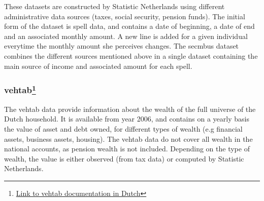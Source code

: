 \documentclass[12pt,a4paper]{article}
\begin{document}
These datasets are constructed by Statistic Netherlands using different administrative data sources (taxes, social security, pension funds). The initial form of the dataset is spell data, and contains a date of beginning, a date of end and an associated monthly amount. A new line is added for a given individual everytime the monthly amount she perceives changes. The secmbus dataset combines the different sources mentioned above in a single dataset containing the main source of income and associated amount for each spell. 

\subsubsection*{vehtab\footnote{\hyperlink{ https://www.cbs.nl/nl-nl/onze-diensten/maatwerk-en-microdata/microdata-zelf-onderzoek-doen/microdatabestanden/vehtab-vermogens-van-huishoudens
		}{Link to vehtab documentation in Dutch}}}

The vehtab data provide information about the wealth of the full universe of the Dutch household. It is available from year 2006, and contains on a yearly basis the value of asset and debt owned, for different types of wealth (e.g financial assets, business assets, housing). 
The vehtab data do not cover all wealth in the national accounts, as pension wealth is not included. 
Depending on the type of wealth, the value is either observed (from tax data) or computed by Statistic Netherlands. 
\end{document}

